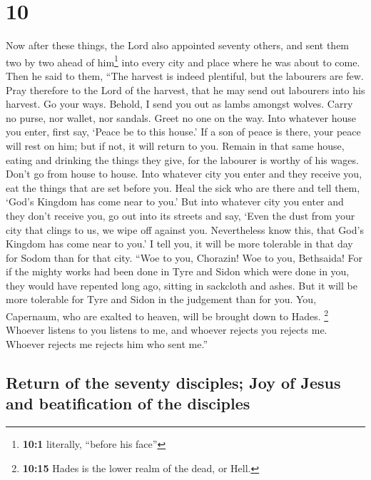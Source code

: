 \hypertarget{section-9}{%
\section{10}\label{section-9}}

 Now after these things, the Lord also appointed seventy
others, and sent them two by two ahead of him\footnote{\textbf{10:1}
  literally, ``before his face''} into every city and place where he was
about to come.  Then he said to them, ``The harvest is
indeed plentiful, but the labourers are few. Pray therefore to the Lord
of the harvest, that he may send out labourers into his harvest.
 Go your ways. Behold, I send you out as lambs amongst
wolves.  Carry no purse, nor wallet, nor sandals. Greet no
one on the way.  Into whatever house you enter, first say,
`Peace be to this house.'  If a son of peace is there,
your peace will rest on him; but if not, it will return to you.
 Remain in that same house, eating and drinking the things
they give, for the labourer is worthy of his wages. Don't go from house
to house.  Into whatever city you enter and they receive
you, eat the things that are set before you.  Heal the
sick who are there and tell them, `God's Kingdom has come near to you.'
 But into whatever city you enter and they don't receive
you, go out into its streets and say,  `Even the dust
from your city that clings to us, we wipe off against you. Nevertheless
know this, that God's Kingdom has come near to you.'  I
tell you, it will be more tolerable in that day for Sodom than for that
city.  ``Woe to you, Chorazin! Woe to you, Bethsaida! For
if the mighty works had been done in Tyre and Sidon which were done in
you, they would have repented long ago, sitting in sackcloth and ashes.
 But it will be more tolerable for Tyre and Sidon in the
judgement than for you.  You, Capernaum, who are exalted
to heaven, will be brought down to Hades. \footnote{\textbf{10:15} Hades
  is the lower realm of the dead, or Hell.}  Whoever
listens to you listens to me, and whoever rejects you rejects me.
Whoever rejects me rejects him who sent me.''

\hypertarget{return-of-the-seventy-disciples-joy-of-jesus-and-beatification-of-the-disciples}{%
\subsection{Return of the seventy disciples; Joy of Jesus and
beatification of the
disciples}\label{return-of-the-seventy-disciples-joy-of-jesus-and-beatification-of-the-disciples}}

